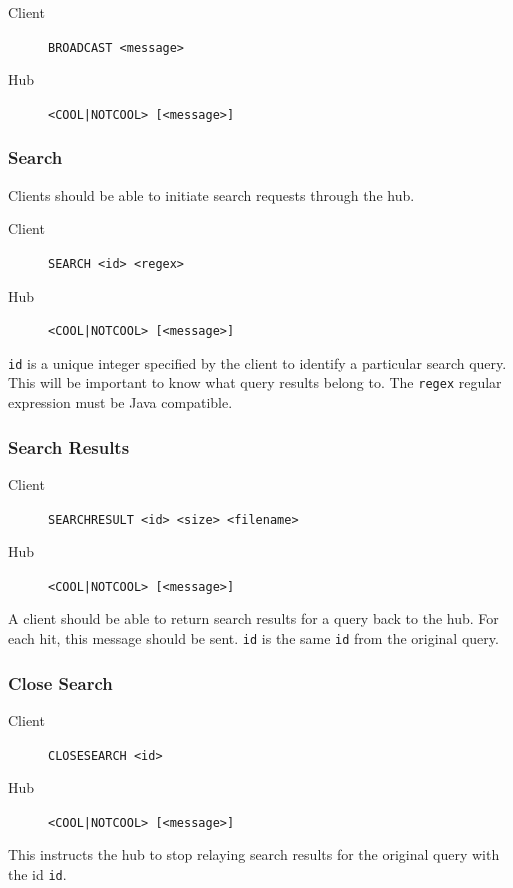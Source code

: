 \documentclass{article}
\begin{document}
\begin{description}
\item[Client] \verb+BROADCAST <message>+
\item[Hub] \verb+<COOL|NOTCOOL> [<message>]+
\end{description}

\subsubsection{Search}
Clients should be able to initiate search requests through the hub.

\begin{description}
\item[Client] \verb+SEARCH <id> <regex>+
\item[Hub] \verb+<COOL|NOTCOOL> [<message>]+
\end{description}

\verb+id+ is a unique integer specified by the client to identify a particular search query.  This will be important to know what query results belong to.  The \verb+regex+ regular expression must be Java compatible.

\subsubsection{Search Results}
\begin{description}
\item[Client] \verb+SEARCHRESULT <id> <size> <filename>+
\item[Hub] \verb+<COOL|NOTCOOL> [<message>]+
\end{description}

A client should be able to return search results for a query back to the hub.  For each hit, this message should be sent.  \verb+id+ is the same \verb+id+ from the original query.

\subsubsection{Close Search}
\begin{description}
\item[Client] \verb+CLOSESEARCH <id>+
\item[Hub] \verb+<COOL|NOTCOOL> [<message>]+
\end{description}

This instructs the hub to stop relaying search results for the original query with the id \verb+id+.
\end{document}
